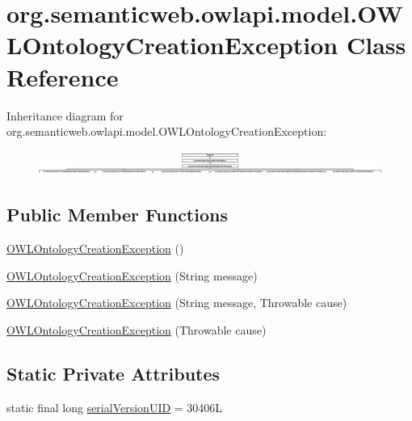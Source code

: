 \hypertarget{classorg_1_1semanticweb_1_1owlapi_1_1model_1_1_o_w_l_ontology_creation_exception}{\section{org.\-semanticweb.\-owlapi.\-model.\-O\-W\-L\-Ontology\-Creation\-Exception Class Reference}
\label{classorg_1_1semanticweb_1_1owlapi_1_1model_1_1_o_w_l_ontology_creation_exception}
}
Inheritance diagram for org.\-semanticweb.\-owlapi.\-model.\-O\-W\-L\-Ontology\-Creation\-Exception\-:\begin{figure}[H]
\begin{center}
\leavevmode
\includegraphics[height=0.806336cm]{classorg_1_1semanticweb_1_1owlapi_1_1model_1_1_o_w_l_ontology_creation_exception}
\end{center}
\end{figure}
\subsection*{Public Member Functions}
\begin{DoxyCompactItemize}
\item 
\hyperlink{classorg_1_1semanticweb_1_1owlapi_1_1model_1_1_o_w_l_ontology_creation_exception_a5767f345e9c90e8fd03e10f3e3ca2cf7}{O\-W\-L\-Ontology\-Creation\-Exception} ()
\item 
\hyperlink{classorg_1_1semanticweb_1_1owlapi_1_1model_1_1_o_w_l_ontology_creation_exception_adf18045df8e517d04b8be39016b7d9f8}{O\-W\-L\-Ontology\-Creation\-Exception} (String message)
\item 
\hyperlink{classorg_1_1semanticweb_1_1owlapi_1_1model_1_1_o_w_l_ontology_creation_exception_a95a351877a4a8003721bb3296f30cce6}{O\-W\-L\-Ontology\-Creation\-Exception} (String message, Throwable cause)
\item 
\hyperlink{classorg_1_1semanticweb_1_1owlapi_1_1model_1_1_o_w_l_ontology_creation_exception_a9bfc6c05039d80918e4d9532511f9079}{O\-W\-L\-Ontology\-Creation\-Exception} (Throwable cause)
\end{DoxyCompactItemize}
\subsection*{Static Private Attributes}
\begin{DoxyCompactItemize}
\item 
static final long \hyperlink{classorg_1_1semanticweb_1_1owlapi_1_1model_1_1_o_w_l_ontology_creation_exception_af1fe738fc42bbb69b890c231dea0df34}{serial\-Version\-U\-I\-D} = 30406\-L
\end{DoxyCompactItemize}
